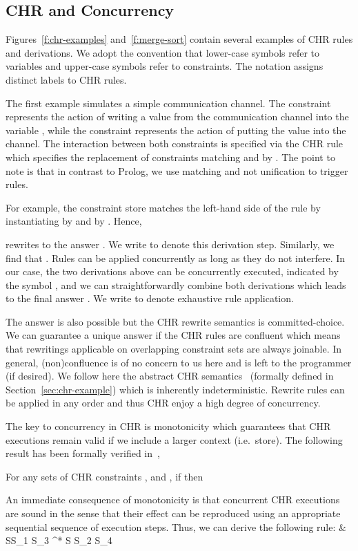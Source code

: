 \documentclass{tlp}
\begin{document}
\subsection{CHR and Concurrency}

Figures~\ref{f:chr-examples} 
and~\ref{f:merge-sort} contain several examples of CHR rules and derivations.
We adopt the convention that lower-case symbols refer to variables and upper-case symbols refer to
constraints. The notation  assigns distinct labels to CHR rules.

The first example simulates a simple communication channel.
The  constraint represents the action of writing a value from the communication
channel into the variable , while the  constraint represents the action
of putting the value  into the channel.
The interaction between both constraints is specified via the CHR rule  which
specifies the  replacement of constraints matching  and  by .
The point to note is that
in contrast to Prolog, we use matching and not unification to trigger rules.

For example, the constraint store  matches the left-hand side of 
the  rule
by instantiating  by  and  by . Hence, 

rewrites to the answer .
We write  to denote this derivation step.
Similarly, we find that
.
Rules can be applied concurrently as long as they do not interfere.
In our case, the two derivations above can be concurrently executed, indicated by the 
symbol , and we can straightforwardly combine both derivations
which leads to the final answer .
We write  to denote exhaustive rule application.

The answer  is also possible but the CHR rewrite semantics is committed-choice. 
We can guarantee a unique answer if the CHR rules are confluent which
means that rewritings applicable on overlapping constraint sets are always joinable.
In general, (non)confluence is of no concern to us here and is left to the programmer (if desired).
We follow here the abstract CHR semantics~\cite{fruehwirth98:chr:art}
(formally defined in Section~\ref{sec:chr-example})
which is inherently indeterministic.  Rewrite rules can be applied in any order
and thus CHR enjoy a high degree of concurrency.


The key to concurrency in CHR is monotonicity which 
guarantees that CHR executions remain valid if we include a larger context (i.e.~store).
The following result has been formally verified in~\cite{Abdennadher99confluenceand},
\begin{theorem}  \label{theo:monotonicity}
    For any sets of CHR constraints , and , if 
    then 
\end{theorem}
An immediate consequence of monotonicity is that concurrent CHR executions are sound
in the sense that their effect can be reproduced using an appropriate sequential
sequence of execution steps. Thus, we can derive the following  rule:
 &
          {S\uplus S_1 \uplus S_3 \rightarrowtail^* S \uplus S_2 \uplus S_4}
\eda
\end{document}
